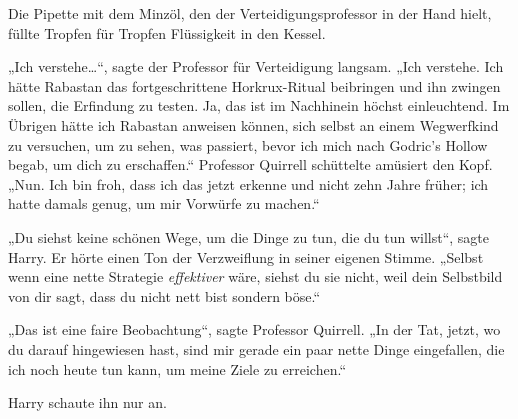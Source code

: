Die Pipette mit dem Minzöl, den der Verteidigungsprofessor in der Hand hielt, füllte Tropfen für Tropfen Flüssigkeit in den Kessel.

„Ich verstehe…“, sagte der Professor für Verteidigung langsam. „Ich verstehe. Ich hätte Rabastan das fortgeschrittene Horkrux-Ritual beibringen und ihn zwingen sollen, die Erfindung zu testen. Ja, das ist im Nachhinein höchst einleuchtend. Im Übrigen hätte ich Rabastan anweisen können, sich selbst an einem Wegwerfkind zu versuchen, um zu sehen, was passiert, bevor ich mich nach Godric’s Hollow begab, um dich zu erschaffen.“
Professor Quirrell schüttelte amüsiert den Kopf.
„Nun. Ich bin froh, dass ich das jetzt erkenne und nicht zehn Jahre früher; ich hatte damals genug, um mir Vorwürfe zu machen.“

„Du siehst keine schönen Wege, um die Dinge zu tun, die du tun willst“, sagte Harry.
Er hörte einen Ton der Verzweiflung in seiner eigenen Stimme.
„Selbst wenn eine nette Strategie \emph{effektiver} wäre, siehst du sie nicht, weil dein Selbstbild von dir sagt, dass du nicht nett bist sondern böse.“

„Das ist eine faire Beobachtung“, sagte Professor Quirrell.
„In der Tat, jetzt, wo du darauf hingewiesen hast, sind mir gerade ein paar nette Dinge eingefallen, die ich noch heute tun kann, um meine Ziele zu erreichen.“

Harry schaute ihn nur an.

